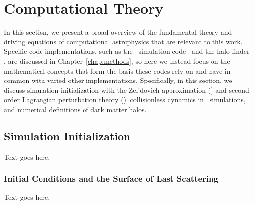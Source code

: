 
%
%

\section{Computational Theory}
\label{sec:computational_theory}



In this section, we present a broad overview of the fundamental theory and driving equations of computational astrophysics that are relevant to this work.  Specific code implementations, such as the \nbody\ simulation code \gadgettwo\ and the halo finder \rockstar, are discussed in Chapter~\ref{chap:methods}, so here we instead focus on the mathematical concepts that form the basis these codes rely on and have in common with varied other implementations.  Specifically, in this section, we discuss simulation initialization with the Zel'dovich approximation (\za) and second-order Lagrangian perturbation theory (\lpt), collisionless dynamics in \nbody\ simulations, and numerical definitions of dark matter halos.




\subsection{Simulation Initialization}
\label{subsec:computational_theory--simulation_initialization}


Text goes here.



\subsubsection{Initial Conditions and the Surface of Last Scattering}
\label{subsubsec:computational_theory--simulation_initialization--initial_conditions}


Text goes here.



